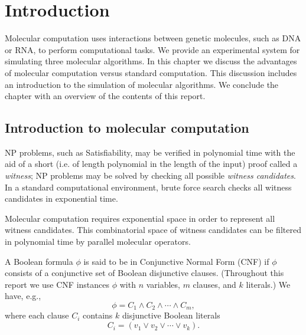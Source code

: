 \chapter{Introduction}


Molecular computation uses interactions between genetic molecules, such as DNA or RNA, to perform computational tasks.  We provide an experimental system for simulating three molecular algorithms.  In this chapter we discuss the advantages of molecular computation versus standard computation.  This discussion includes an introduction to the simulation of molecular algorithms.  We conclude the chapter with an overview of the contents of this report.

\section{Introduction to molecular computation}
	
				
\textsf{NP} problems, such as {\sc Satisfiability}, may be verified in polynomial time with the aid of a short (i.e. of length polynomial in the length of the input) proof called a \textit{witness}; \textsf{NP} problems may be solved by checking all possible \textit{witness candidates}.  In a standard computational environment, brute force search checks all witness candidates in exponential time.

Molecular computation requires exponential space in order to represent all witness candidates.  This combinatorial space of witness candidates can be filtered in polynomial time by parallel molecular operators.

A Boolean formula $\phi$ is said to be in Conjunctive Normal Form (CNF) if $\phi$ consists of a conjunctive set of Boolean disjunctive clauses.  (Throughout this report we use CNF instances $\phi$ with $n$ variables, $m$ clauses, and $k$ literals.)  We have, e.g.,
\[
\phi = C_1 \wedge C_2 \wedge \cdots \wedge C_m, 
\]
where each clause $C_i$ contains $k$ disjunctive Boolean literals
\[
C_i = (v_1 \vee v_2 \vee \cdots \vee v_k).
\]

